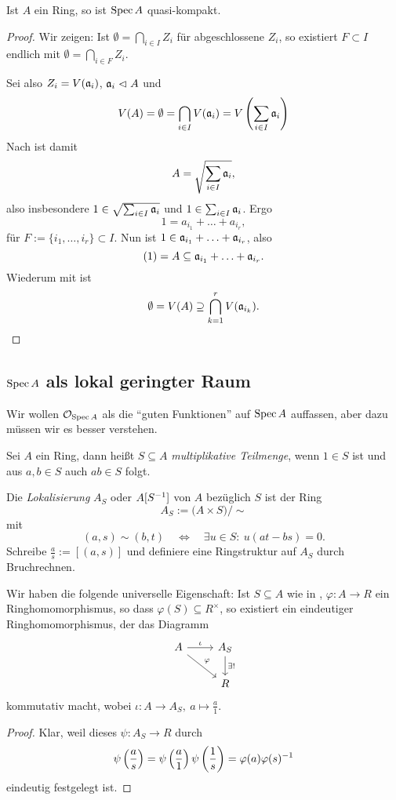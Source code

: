 \begin{satz}
	Ist $A$ ein Ring, so ist $\operatorname{Spec} A$ quasi-kompakt.
\end{satz}
\begin{proof}
	Wir zeigen: Ist $\emptyset = \bigcap_{i\in I} Z_i$ für abgeschlossene
	$Z_i$, so existiert $F\subset I$ endlich mit
	$\emptyset = \bigcap_{i\in F} Z_i$.
	
	Sei also $Z_i = V(\mathfrak{a}_i)$, $\mathfrak{a}_i \vartriangleleft A$ und
	\[
		V(A) = \emptyset = \bigcap_{i\in I} V(\mathfrak{a}_i)
		= V\left(\sum_{i\in I} \mathfrak{a}_i\right)
	\]
	Nach  ist damit
	\[
		A = \sqrt{\sum_{i\in I} \mathfrak{a}_i},
	\]
	also insbesondere $1 \in \sqrt{\sum_{i\in I} \mathfrak{a}_i}$ und
	$1 \in \sum_{i\in I} \mathfrak{a}_i$. Ergo
	\[
		1 = a_{i_1} + \ldots + a_{i_r},
	\]
	für $F:= \{i_1, \ldots, i_r\} \subset I$.
	Nun ist
	$1 \in \mathfrak{a}_{i_1} + \ldots + \mathfrak{a}_{i_r}$,
	also 
	\[
		(1) = A \subseteq \mathfrak{a}_{i_1} + \ldots + \mathfrak{a}_{i_r}.
	\]
	Wiederum mit  ist
	\[
		\emptyset = V(A) \supseteq \bigcap_{k=1}^r V(\mathfrak{a}_{i_k}).
	\] 
\end{proof}

\subsection{$\operatorname{Spec} A$ als lokal geringter Raum}

Wir wollen $\mathcal{O}_{\operatorname{Spec} A}$ als die "`guten Funktionen"' auf $\operatorname{Spec} A$ auffassen,
aber dazu müssen wir es besser verstehen. 

\begin{definition}
	\label{def:lokalisierung}
	Sei $A$ ein Ring, dann heißt $S\subseteq A$ \emph{multiplikative Teilmenge},
	wenn $1\in S$ ist und aus $a,b\in S$ auch $ab\in S$ folgt.
	
	Die \emph{Lokalisierung} $A_S$ oder $A[S^{-1}]$ von $A$ bezüglich $S$ ist
	der Ring
	\[
		A_S := \big(A \times S \big) \big/ \sim
	\]
	mit
	\[
		(a,s) \sim (b,t) \quad\Leftrightarrow\quad
		\exists u \in S:\ u(at - bs) = 0.
	\]
	Schreibe $\frac a s := [(a,s)]$ und definiere eine Ringstruktur auf
	$A_S$ durch Bruchrechnen.
\end{definition}

\begin{lemma}
	\label{lemma:universelle eigenschaft lokalisierung}
	Wir haben die folgende universelle Eigenschaft: Ist
	$S\subseteq A$ wie in , $\varphi: A \to R$
	ein Ringhomomorphismus, so dass $\varphi(S) \subseteq R^\times$, so
	existiert ein eindeutiger Ringhomomorphismus, der das
	Diagramm
	\[\begin{tikzcd}
		A \rar{\iota} \arrow{dr}{\varphi} & A_S \dar{\exists!} \\
		& R
	\end{tikzcd}\]
	kommutativ macht, wobei
	$\iota: A \to A_S,\ a \mapsto \frac a 1$.
\end{lemma}
\begin{proof}
	Klar, weil dieses $\psi: A_S \to R$ durch
	\[
		\psi\left(\frac a s\right) = 
		\psi\left(\frac a 1\right) \psi\left(\frac 1 s\right) =
		\varphi(a) \varphi(s)^{-1}
	\]
	eindeutig festgelegt ist.
\end{proof}

